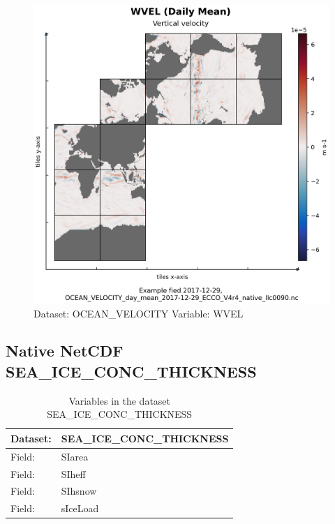 \begin{figure}[H]
\centering
\includegraphics[width=\textwidth]{../images/plots/native_plots/Ocean_Velocity/WVEL.png}
\caption{Dataset: OCEAN\_VELOCITY Variable: WVEL}
\label{tab:table-OCEAN_VELOCITY_WVEL-Plot}
\end{figure}
\pagebreak
\subsection{Native NetCDF SEA\_ICE\_CONC\_THICKNESS}
\newp
\begin{longtable}{|p{}|p{}|}
\caption{Variables in the dataset SEA\_ICE\_CONC\_THICKNESS}
\label{tab:table-SEA_ICE_CONC_THICKNESS-fields} \\ 
\hline \endhead \hline \endfoot
\rowcolor{lightgray} \textbf{Dataset:} & \textbf{SEA\_ICE\_CONC\_THICKNESS} \\ \hline
Field: &SIarea \\ \hline
Field: &SIheff \\ \hline
Field: &SIhsnow \\ \hline
Field: &sIceLoad \\ \hline
\end{longtable}

\pagebreak
